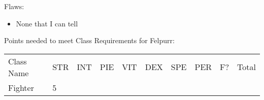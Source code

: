 \documentclass[12pt]{article}
\providecommand{\tightlist}{%
  \setlength{\itemsep}{0pt}\setlength{\parskip}{0pt}}
\begin{document}
Flaws:

\begin{itemize}
\tightlist
\item
  None that I can tell
\end{itemize}

Points needed to meet Class Requirements for Felpurr:

\begin{longtable}[]{@{}llllllllll@{}}
\toprule
\begin{minipage}[t]{0.13\columnwidth}\raggedright\strut
Class Name
\strut\end{minipage} &
\begin{minipage}[t]{0.06\columnwidth}\raggedright\strut
STR
\strut\end{minipage} &
\begin{minipage}[t]{0.06\columnwidth}\raggedright\strut
INT
\strut\end{minipage} &
\begin{minipage}[t]{0.06\columnwidth}\raggedright\strut
PIE
\strut\end{minipage} &
\begin{minipage}[t]{0.06\columnwidth}\raggedright\strut
VIT
\strut\end{minipage} &
\begin{minipage}[t]{0.06\columnwidth}\raggedright\strut
DEX
\strut\end{minipage} &
\begin{minipage}[t]{0.06\columnwidth}\raggedright\strut
SPE
\strut\end{minipage} &
\begin{minipage}[t]{0.06\columnwidth}\raggedright\strut
PER
\strut\end{minipage} &
\begin{minipage}[t]{0.07\columnwidth}\raggedright\strut
F?
\strut\end{minipage} &
\begin{minipage}[t]{0.08\columnwidth}\raggedright\strut
Total
\strut\end{minipage}\tabularnewline
\begin{minipage}[t]{0.13\columnwidth}\raggedright\strut
Fighter
\strut\end{minipage} &
\begin{minipage}[t]{0.06\columnwidth}\raggedright\strut
5
\strut\end{minipage} &
\begin{minipage}[t]{0.06\columnwidth}\raggedright\strut
\strut\end{minipage} &
\begin{minipage}[t]{0.06\columnwidth}\raggedright\strut

\end{minipage}
\end{longtable}
\end{document}
